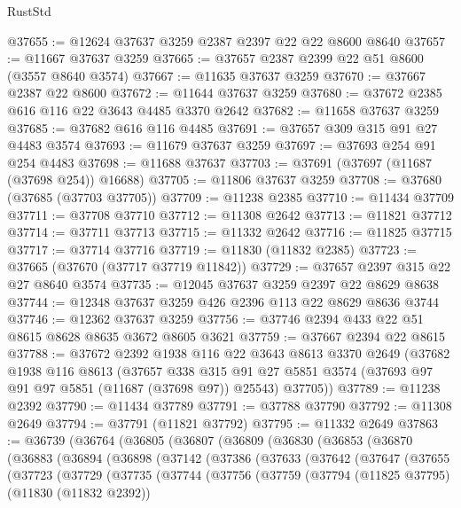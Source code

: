 \begin{lexlean}{RustStd}
\begin{coremodule}
@37655 := @12624 @37637 @3259 @2387 @2397 @22 @22 @8600 @8640
@37657 := @11667 @37637 @3259
@37665 := @37657 @2387 @2399 @22 @51 @8600 (@3557 @8640 @3574)
@37667 := @11635 @37637 @3259
@37670 := @37667 @2387 @22 @8600
@37672 := @11644 @37637 @3259
@37680 := @37672 @2385 @616 @116 @22 @3643 @4485 @3370 @2642
@37682 := @11658 @37637 @3259
@37685 := @37682 @616 @116 @4485
@37691 := @37657 @309 @315 @91 @27 @4483 @3574
@37693 := @11679 @37637 @3259
@37697 := @37693 @254 @91 @254 @4483
@37698 := @11688 @37637
@37703 := @37691 (@37697 (@11687 (@37698 @254)) @16688)
@37705 := @11806 @37637 @3259
@37708 := @37680 (@37685 (@37703 @37705))
@37709 := @11238 @2385
@37710 := @11434 @37709
@37711 := @37708 @37710
@37712 := @11308 @2642
@37713 := @11821 @37712
@37714 := @37711 @37713
@37715 := @11332 @2642
@37716 := @11825 @37715
@37717 := @37714 @37716
@37719 := @11830 (@11832 @2385)
@37723 := @37665 (@37670 (@37717 @37719 @11842))
@37729 := @37657 @2397 @315 @22 @27 @8640 @3574
@37735 := @12045 @37637 @3259 @2397 @22 @8629 @8638
@37744 := @12348 @37637 @3259 @426 @2396 @113 @22 @8629 @8636 @3744
@37746 := @12362 @37637 @3259
@37756 := @37746 @2394 @433 @22 @51 @8615 @8628 @8635 @3672 @8605 @3621
@37759 := @37667 @2394 @22 @8615
@37788 := @37672
    @2392
    @1938
    @116
    @22
    @3643
    @8613
    @3370
    @2649
    (@37682
      @1938
      @116
      @8613
      (@37657
        @338
        @315
        @91
        @27
        @5851
        @3574
        (@37693 @97 @91 @97 @5851 (@11687 (@37698 @97)) @25543)
        @37705))
@37789 := @11238 @2392
@37790 := @11434 @37789
@37791 := @37788 @37790
@37792 := @11308 @2649
@37794 := @37791 (@11821 @37792)
@37795 := @11332 @2649
@37863 := @36739
    (@36764
      (@36805
        (@36807
          (@36809
            (@36830
              (@36853
                (@36870
                  (@36883
                    (@36894
                      (@36898
                        (@37142
                          (@37386
                            (@37633
                              (@37642
                                (@37647
                                  (@37655
                                    (@37723
                                      (@37729
                                        (@37735
                                          (@37744
                                            (@37756
                                              (@37759
                                                (@37794
                                                  (@11825 @37795)
                                                  (@11830 (@11832 @2392))

\end{coremodule}
\end{lexlean}
